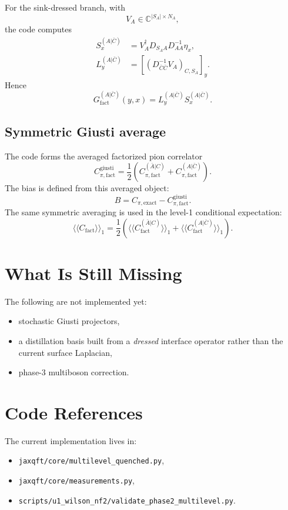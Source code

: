 \documentclass[11pt]{article}
\begin{document}
For the sink-dressed branch, with
\begin{equation}
V_A \in \mathbb{C}^{|S_A| \times N_A},
\end{equation}
the code computes
\begin{align}
S_x^{(A|\bar C)}
&=
V_A^\dagger D_{S_A A} D_{AA}^{-1}\eta_x,\\
L_y^{(A|\bar C)}
&=
\left[\left(D_{\bar C\bar C}^{-1}V_A\right)_{C,S_A}\right]_y.
\end{align}
Hence
\begin{equation}
G_{\mathrm{fact}}^{(A|\bar C)}(y,x)
=
L_y^{(A|\bar C)} S_x^{(A|\bar C)}.
\end{equation}

\subsection{Symmetric Giusti average}
The code forms the averaged factorized pion correlator
\begin{equation}
C_{\pi,\mathrm{fact}}^{\mathrm{giusti}}
=
\frac12\left(
C_{\pi,\mathrm{fact}}^{(\bar A|C)}
+
C_{\pi,\mathrm{fact}}^{(A|\bar C)}
\right).
\end{equation}
The bias is defined from this averaged object:
\begin{equation}
B = C_{\pi,\mathrm{exact}} - C_{\pi,\mathrm{fact}}^{\mathrm{giusti}}.
\end{equation}
The same symmetric averaging is used in the level-1 conditional expectation:
\begin{equation}
\langle\!\langle C_{\mathrm{fact}} \rangle\!\rangle_1
=
\frac12\left(
\langle\!\langle C_{\mathrm{fact}}^{(\bar A|C)} \rangle\!\rangle_1
+
\langle\!\langle C_{\mathrm{fact}}^{(A|\bar C)} \rangle\!\rangle_1
\right).
\end{equation}

\section{What Is Still Missing}
The following are not implemented yet:
\begin{itemize}
  \item stochastic Giusti projectors,
  \item a distillation basis built from a \emph{dressed} interface operator rather than the
  current surface Laplacian,
  \item phase-3 multiboson correction.
\end{itemize}

\section{Code References}
The current implementation lives in:
\begin{itemize}
  \item \texttt{jaxqft/core/multilevel\_quenched.py},
  \item \texttt{jaxqft/core/measurements.py},
  \item \texttt{scripts/u1\_wilson\_nf2/validate\_phase2\_multilevel.py}.
\end{itemize}
\end{document}
